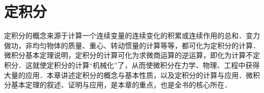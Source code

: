 \chapter{定积分}\label{chap:07}

定积分的概念来源于计算一个连续变量的连续变化的积累或连续作用的总和．变力做功，非均匀物体的质量、重心、转动惯量的计算等等，都可化为定积分的计算．微积分基本定理说明，定积分的计算可化为求微商运算的逆运算，即化为计算不定积分．这就使定积分的计算“机械化”了，从而使微积分在力学、物理、工程中获得大量的应用．本章讲述定积分的概念与基本性质，以及定积分的计算与应用．微积分基本定理的叙述、证明与应用，是本章的重点，也是全书的核心所在．








